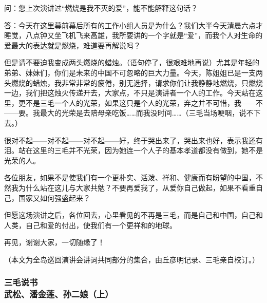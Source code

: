 \par 问：您上次演讲过“燃烧是我不灭的爱”，能不能解释这句话？
\par 答：今天在这里幕前幕后所有的工作小组人员是为什么？我们大半今天清晨六点才睡觉，八点钟又坐飞机飞来高雄，我所要讲的一个字就是“爱”，而我个人对生命的爱最大的表达就是燃烧，难道要再解说吗？
\par 但是请不要迫我变成两头燃烧的蜡烛。（语句停了，很艰难地再说）尤其是年轻的弟弟、妹妹们，你们是未来的中国不可忽略的巨大力量。今天，陈姐姐已是一支两头燃烧的蜡烛，我非常非常的疲倦，别无选择，请求你们让我静静地燃烧，只燃烧一边，我们把这烛火传递开去，大家点，不只是演讲者一个人的工作。今天站在这里，更不是三毛一个人的光荣，如果这只是个人的光荣，弃之并不可惜，我——不——要。我最大的光荣是去陪母亲吃饭……而我没时间……（三毛当场哽咽，说不下去。）
\par 很对不起——对不起——对不起——好，终于哭出来了，哭出来也好，表示我还有泪。站在这里的三毛并不光荣，因为她连一个人子的基本孝道都没有做到，她不是光荣的人。
\par 各位朋友，如果不是使我们有一个更朴实、活泼、祥和、健康而有盼望的中国，不然我为什么站在这儿与大家共勉？不要再爱我了，从爱你自己做起，如果不看重自己，国家又如何强盛起来？
\par 但愿这场演讲之后，各位回去，心里看见的不再是三毛，而是自己和中国，自己和人类，自己和爱的付出，使我们有一个更祥和的地球。
\par 再见，谢谢大家，一切随缘了！
\par （本文为全岛巡回演讲会讲词共同部分的集合，由丘彦明记录、三毛亲自校订。）










\subsubsection{三毛说书\\\small{武松、潘金莲、孙二娘（上）}}

